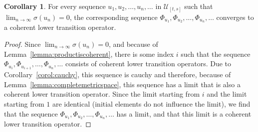 \documentclass[10pt]{paper}
\theoremstyle{definition}
\newtheorem{corollary}[theorem]{Corollary}
\begin{document}
\begin{corollary}\label{corol:limitexistsandiscoherent}
For every sequence $u_1,u_2,\dots,u_n,\dots$ in $\mathcal{U}_{[t,s]}$ such that $\lim_{n\to\infty}\sigma(u_n)=0$, the corresponding sequence $\Phi_{u_1},\Phi_{u_2},\dots,\Phi_{u_n},\dots$ converges to a coherent lower transition operator.
\end{corollary}
\begin{proof}
Since $\lim_{n\to\infty}\sigma(u_n)=0$, and because of Lemma~\ref{lemma:productiscoherent}, there is some index $i$ such that the sequence $\Phi_{u_i},\Phi_{u_{i+1}},\dots,\Phi_{u_n},\dots$ consists of coherent lower transition operators. Due to Corollary~\ref{corol:cauchy}, this sequence is cauchy and therefore, because of Lemma~\ref{lemma:completemetricspace}, this sequence has a limit that is also a coherent lower transition operator. Since the limit starting from $i$ and the limit starting from $1$ are identical (initial elements do not influence the limit), we find that the sequence $\Phi_{u_1},\Phi_{u_2},\dots,\Phi_{u_n},\dots$ has a limit, and that this limit is a coherent lower transition operator.
\end{proof}
\end{document}
